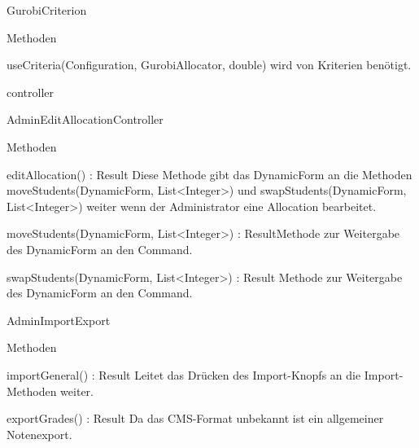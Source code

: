 \documentclass[parskip=full]{scrartcl}
\newcommand{\changeDescription}[1]{{\newline\color{black}\normalfont #1}}
\newcommand{\code}[1]{{\ttfamily #1}}
\begin{document}
\begin{itemPackage}
\begin{itemClass}
\begin{itemClassSub}
\end{itemClassSub}
\item GurobiCriterion
\begin{itemClassSub}
\item Methoden
\begin{itemChange}
\item useCriteria(Configuration, GurobiAllocator, double)
\changeDescription{\code{GurobiAllocator} wird von Kriterien benötigt.}
\end{itemChange}
\end{itemClassSub}
\end{itemClass}
\item controller
\begin{itemClass}
\item AdminEditAllocationController
\begin{itemClassSub}
\item Methoden
\begin{itemPlus}
\item editAllocation() : Result \changeDescription{Diese Methode gibt das
\code{DynamicForm} an die Methoden \code{moveStudents(DynamicForm, List<Integer>)} und
\code{swapStudents(DynamicForm, List<Integer>)} weiter wenn der Administrator
eine Allocation bearbeitet. }
\end{itemPlus}
\begin{itemChange}
\item moveStudents(DynamicForm, List<Integer>) : Result\changeDescription{Methode zur Weitergabe des \code{DynamicForm} an den
\code{Command}.}
\item swapStudents(DynamicForm, List<Integer>) : Result
\changeDescription{Methode zur Weitergabe des \code{DynamicForm} an den
\code{Command}.}
\end{itemChange}
\end{itemClassSub}
\item AdminImportExport
\item \begin{itemClassSub}
\item Methoden
\begin{itemPlus}
\item importGeneral() : Result \changeDescription{Leitet das Drücken des
Import-Knopfs an die Import-Methoden weiter.}
\item exportGrades() : Result \changeDescription{Da das CMS-Format unbekannt
ist ein allgemeiner Notenexport.}
\end{itemPlus}
\end{itemClassSub}

\end{itemClass}
\end{itemPackage}
\end{document}
